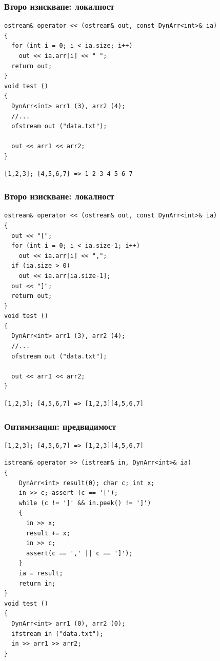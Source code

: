 \documentclass{beamer}
\begin{document}
\begin{frame}[fragile]
\frametitle{Второ изискване: локалност}

\begin{flushleft}
\begin{lstlisting}
ostream& operator << (ostream& out, const DynArr<int>& ia)
{
  for (int i = 0; i < ia.size; i++)
    out << ia.arr[i] << " ";
  return out;
}
void test ()
{
  DynArr<int> arr1 (3), arr2 (4);
  //...
  ofstream out ("data.txt");

  out << arr1 << arr2;
}
\end{lstlisting}  
\end{flushleft}

\begin{lstlisting}
[1,2,3]; [4,5,6,7] => 1 2 3 4 5 6 7
\end{lstlisting}  

\end{frame}


\begin{frame}[fragile]
\frametitle{Второ изискване: локалност}


\begin{flushleft}
\begin{lstlisting}
ostream& operator << (ostream& out, const DynArr<int>& ia)
{
  out << "[";
  for (int i = 0; i < ia.size-1; i++)
    out << ia.arr[i] << ",";
  if (ia.size > 0)
    out << ia.arr[ia.size-1];
  out << "]";
  return out;
}
void test ()
{
  DynArr<int> arr1 (3), arr2 (4);
  //...
  ofstream out ("data.txt");

  out << arr1 << arr2;
}
\end{lstlisting}  
\end{flushleft}

\begin{lstlisting}
[1,2,3]; [4,5,6,7] => [1,2,3][4,5,6,7]
\end{lstlisting}  

\end{frame}



\begin{frame}[fragile]
\frametitle{Оптимизация: предвидимост}

\begin{lstlisting}
[1,2,3]; [4,5,6,7] => [1,2,3][4,5,6,7]
\end{lstlisting}  

\begin{flushleft}
\begin{lstlisting}
istream& operator >> (istream& in, DynArr<int>& ia)
{
    DynArr<int> result(0); char c; int x;
    in >> c; assert (c == '[');
    while (c != ']' && in.peek() != ']')
    {
      in >> x;
      result += x;
      in >> c;
      assert(c == ',' || c == ']');
    }
    ia = result;
    return in;
}
void test ()
{
  DynArr<int> arr1 (0), arr2 (0);
  ifstream in ("data.txt");
  in >> arr1 >> arr2;
}
\end{lstlisting}  
\end{flushleft}


\end{frame}
\end{document}
